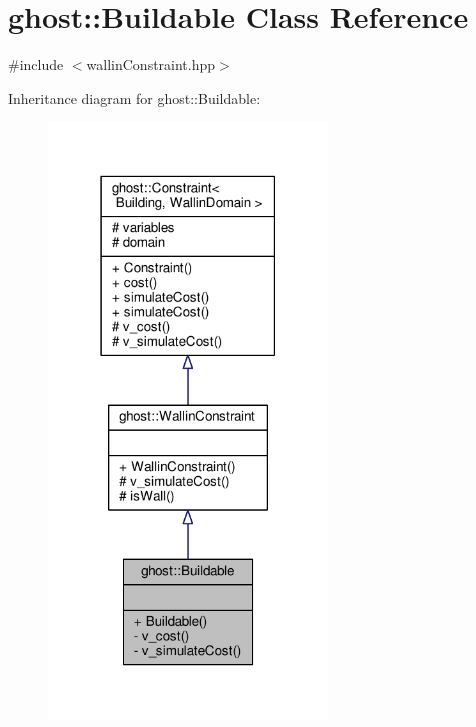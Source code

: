 \hypertarget{classghost_1_1Buildable}{\section{ghost\-:\-:Buildable Class Reference}
\label{classghost_1_1Buildable}
}


{\ttfamily \#include $<$wallin\-Constraint.\-hpp$>$}



Inheritance diagram for ghost\-:\-:Buildable\-:
\nopagebreak
\begin{figure}[H]
\begin{center}
\leavevmode
\includegraphics[width=210pt]{classghost_1_1Buildable__inherit__graph}
\end{center}
\end{figure}


